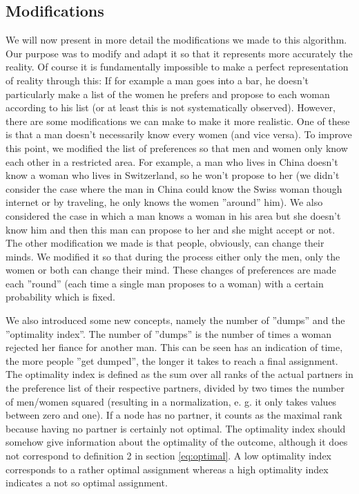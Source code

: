 \documentclass[11pt]{article}
\begin{document}
\subsection{Modifications} \label{mods}

We will now present in more detail the modifications we made to this algorithm. Our purpose was 
to modify and adapt it so that it represents more accurately the reality. Of course it is fundamentally 
impossible to make a perfect representation of reality through this: If for example a man 
goes into a bar, he doesn't particularly make a list of the women he prefers and propose to each 
woman according to his list (or at least this is not systematically observed). 
However, there are some modifications we can make to make it more realistic. One of these is that 
a man doesn't necessarily know every women (and vice versa). To improve this point, we modified 
the list of preferences so that men and women only know each other in a restricted area. For 
example, a man who lives in China doesn't know a woman who lives in Switzerland, so he won't 
propose to her (we didn't consider the case where the man in China could know the Swiss 
woman though internet or by traveling, he only knows the women ''around'' him). We also considered 
the case in which a man knows a woman in his area but she doesn't know him and then this man can 
propose to her and she might accept or not. 
The other modification we made is that people, obviously, can change their minds. We modified it so 
that during the process either only the men, only the women or both can change their mind. These 
changes of preferences are made each ''round'' (each time a single man proposes to a woman) with a 
certain probability which is fixed.

We also introduced some new concepts, namely the number of ''dumps'' and the ''optimality index''. The 
number of ''dumps'' is the number of times a woman rejected her fiance for another man. This can 
be seen has an indication of time, the more people ''get dumped'', the longer it takes to reach a final 
assignment. 
The optimality index is defined as the sum over all ranks of the actual partners
in the preference list of their respective partners, divided by two times the number of men/women squared (resulting in a normalization, e. g. 
it only takes values between zero and one). If a node has no partner, it counts as the maximal rank because having no partner is
certainly not optimal. The optimality index should somehow give information about the optimality of the outcome, although it does
not correspond to definition 2 in section \ref{eq:optimal}. A low optimality index corresponds to a rather optimal assignment whereas a high
optimality index indicates a not so optimal assignment.
\end{document}
